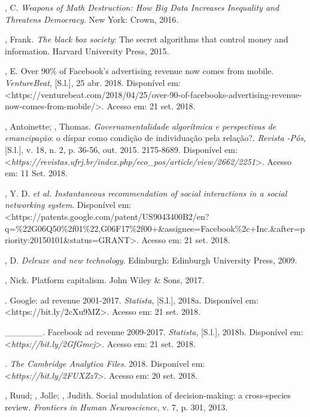 \begin{Parskip}
, C. \emph{Weapons of Math Destruction: How Big Data Increases
Inequality and Threatens Democracy}. New York: Crown, 2016.

, Frank\emph{. The black box society}: The secret algorithms
that control money and information. Harvard University Press, 2015.

, E. Over 90\% of Facebook's advertising revenue now comes
from mobile. \emph{VentureBeat}, {[}S.l.{]}, 25 abr. 2018. Disponível
em:
\textless{}https://venturebeat.com/2018/04/25/over-90-of-facebooks-advertising-revenue-now-comes-from-mobile/\textgreater{}.
Acesso em: 21 set. 2018.

, Antoinette; , Thomas. \emph{Governamentalidade
algorítmica e perspectivas de emancipação}: o díspar como condição de
individuação pela relação?. \emph{Revista -Pós}, {[}S.l.{]}, v. 18,
n. 2, p. 36-56, out. 2015.  2175-8689. Disponível em:
\textless{}\emph{https://revistas.ufrj.br/index.php/eco\_pos/article/view/2662/2251}\textgreater{}.
Acesso em: 11 Set. 2018.

, Y. D. \emph{et al.} \emph{Instantaneous recommendation of
social interactions in a social networking system}. Disponível em:
\textless{}https://patents.google.com/patent/US9043400B2/en?q=\%22G06Q50\%2f01\%22,G06F17\%2f00+\&assignee=Facebook\%2c+Inc.\&after=priority:20150101\&status=GRANT\textgreater{}.
Acesso em: 21 set. 2018.

, D. \emph{Deleuze and new technology}. Edinburgh: Edinburgh
University Press, 2009.

, Nick. Platform capitalism. John Wiley \& Sons, 2017.

. Google: ad revenue 2001-2017. \emph{Statista}, {[}S.l.{]},
2018a. Disponível em: \textless{}https://bit.ly/2cXu9MZ\textgreater{}.
Acesso em: 21 set. 2018.

\_\_\_\_\_\_. Facebook ad revenue 2009-2017. \emph{Statista},
{[}S.l.{]}, 2018b. Disponível em:
\textless{}\emph{https://bit.ly/2GfGmcj}\textgreater{}.
Acesso em: 21 set. 2018.

. \emph{The Cambridge Analytica Files}. 2018. Disponível
em: \textless{}\emph{https://bit.ly/2FUXZz7}\textgreater{}. Acesso em: 20 set. 2018.

, Ruud; , Jolle; , Judith. Social modulation of
decision-making: a cross-species review. \emph{Frontiers in Human
Neuroscience}, v. 7, p. 301, 2013.


\end{Parskip}
